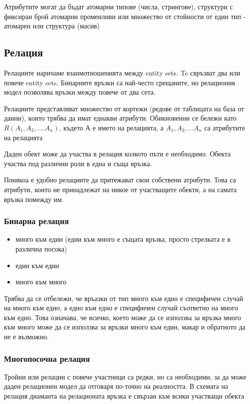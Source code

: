 \documentclass[fleqn,12pt]{article}
\begin{document}
    Атрибутите могат да бъдат атомарни типове (числа, стрингове), структури с фиксиран брой атомарни променливи или множество от стойности от един тип - атомарен или структура (масив)


\subsection{Релация}
    Релациите наричаме взаимотношенията между entity sets. Te свръзват два или повече entity sets. Бинарните връзки са най-често срещаните, но релациония модел позволява връзки между повече от два сета.

    Релациите представляват множество от кортежи (редове от таблицата на база от данни), които трябва да имат еднакви атрибути. Обикновенни се бележи като $R(A_1, A_2, .... A_n)$, където А е името на релацията, а $A_1, A_2, ... A_n$ са атрибутите на релацията

    Даден обект може да участва в релация колкото пъти е необходимо. Обекта участва под различни роли в една и съща връзка.

    Понякоа е удобно релациите да притежават свои собствени атрибути. Това са атрибути, които не принадлежат на никое от участващите обекти, а на самата връзка помежду им. 


\subsubsection{Бинарна релация}


\begin{itemize}
	\item много към един (едни към много е същата връзка, просто стрелката е в различна посока)
	\item един към един 
	\item много към много
\end{itemize}

    Трябва да се отбележи, че връазки от тип много към едно е специфичен случай на много към едно, а едно към едно е специфичен случай съответно на много към едно. Това означава, че всичко, което може да се използва за връзка много към много може да се използва за връзки много към един, макар и обратното да не е възможно.


\subsubsection{Многопосочна релация}
    Тройни или релации с повече участници са редки, но са необходими, за да може даден релационен модел да отговаря по-точно на реалността. В схемата на релация диаманта на релационата връзка е свързан към всики участващи обекта 
\end{document}
